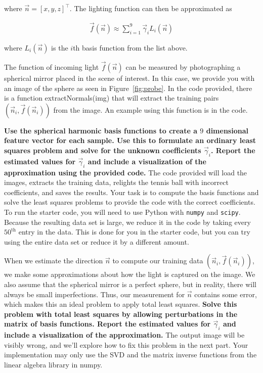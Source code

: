\begin{Parts}
where $\vec{n}=[x,y,z]^\top$.  The lighting function can then be approximated as

\begin{align*}
\vec{f}(\vec{n})\approx\sum_{i=1}^9 \vec{\gamma}_i L_i(\vec{n})
\end{align*}

where $L_i(\vec{n})$ is the $i$th basis function from the list above.

The function of incoming light $\vec{f}(\vec{n})$ can be measured by photographing a spherical mirror placed in the scene of interest.  In this case, we provide you with an image of the sphere as seen in Figure~\ref{fig:probe}.  In the code provided, there is a function extractNormals(img) that will extract the training pairs $(\vec{n}_i,\vec{f}(\vec{n}_i))$ from the image.  An example using this function is in the code.

\textbf{Use the spherical harmonic basis functions to create a $9$ dimensional feature vector for each sample.  Use this to formulate an ordinary least squares problem and solve for the unknown coefficients $\vec{\gamma}_i$.  Report the estimated values for $\vec{\gamma}_i$ and include a visualization of the approximation using the provided code.} The code provided will load the images, extracts the training data, relights the tennis ball with incorrect coefficients, and saves the results.  Your task is to compute the basis functions and solve the least squares problems to provide the code with the correct coefficients.  To run the starter code, you will need to use Python with \texttt{numpy} and \texttt{scipy}.  Because the resulting data set is large, we reduce it in the code by taking every $50^\text{th}$ entry in the data.  This is done for you in the starter code, but you can try using the entire data set or reduce it by a different amount.



\Part When we estimate the direction $\vec{n}$ to compute our training data  $(\vec{n}_i,\vec{f}(\vec{n}_i))$, we make some approximations about how the light is captured on the image.  We also assume that the spherical mirror is a perfect sphere, but in reality, there will always be small imperfections.  Thus, our measurement for $\vec{n}$ contains some error, which makes this an ideal problem to apply total least squares.  \textbf{Solve this problem with total least squares by allowing perturbations in the matrix of basis functions.  Report the estimated values for $\vec{\gamma}_i$ and include a visualization of the approximation.}  The output image will be visibly wrong, and we'll explore how to fix this problem in the next part.  Your implementation may only use the SVD and the matrix inverse functions from the linear algebra library in numpy.




\end{Parts}

